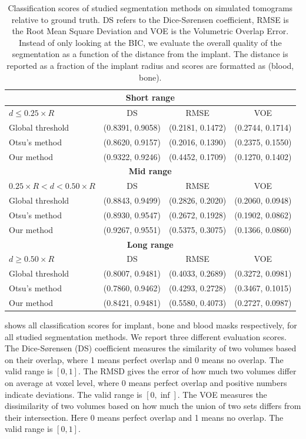 \begin{table}[]
\caption{
	Classification scores of studied segmentation methods on simulated
	tomograms relative to ground truth. DS refers to the Dice-Sørensen
	coefficient, RMSE is the Root Mean Square Deviation and VOE is the
	Volumetric Overlap Error. Instead of only looking at the BIC, we
	evaluate the overall quality of the segmentation as a function of the
	distance from the implant. The distance is reported as a fraction of the
	implant radius and scores are formatted as (blood, bone).
        }
\label{tab:scores}
\centering
\begin{tabular}{lccc}
\bottomrule
\multicolumn{4}{c}{\textbf{Short range}} \\
\toprule
$d \leq 0.25 \times R$ & DS & RMSE & VOE \\
\midrule
Global threshold & (0.8391, 0.9058) & (0.2181, 0.1472) & (0.2744, 0.1714) \\
Otsu's method    & (0.8620, 0.9157) & (0.2016, 0.1390) & (0.2375, 0.1550) \\
Our method       & (0.9322, 0.9246) & (0.4452, 0.1709) & (0.1270, 0.1402) \\
\bottomrule
\multicolumn{4}{c}{\textbf{Mid range}} \\
\toprule
$ 0.25 \times R < d < 0.50 \times R$ & DS & RMSE & VOE \\
\midrule
Global threshold & (0.8843, 0.9499) & (0.2826, 0.2020) & (0.2060, 0.0948) \\
Otsu's method    & (0.8930, 0.9547) & (0.2672, 0.1928) & (0.1902, 0.0862) \\
Our method       & (0.9267, 0.9551) & (0.5375, 0.3075) & (0.1366, 0.0860) \\
\bottomrule
\multicolumn{4}{c}{\textbf{Long range}} \\
\toprule
$d \geq 0.50 \times R$   & DS & RMSE & VOE \\
\midrule
Global threshold & (0.8007, 0.9481) & (0.4033, 0.2689) & (0.3272, 0.0981) \\
Otsu's method    & (0.7860, 0.9462) & (0.4293, 0.2728) & (0.3467, 0.1015) \\
Our method       & (0.8421, 0.9481) & (0.5580, 0.4073) & (0.2727, 0.0987) \\
\bottomrule
\end{tabular}
\end{table}

 shows all classification scores for implant, bone and blood masks
respectively, for all studied segmentation methods. We report three different
evaluation scores. The Dice-Sørensen (DS) coefficient measures the similarity
of two volumes based on their overlap, where 1 means perfect overlap and 0
means no overlap. The valid range is $[0,1]$. The RMSD gives the error of how
much two volumes differ on average at voxel level, where 0 means perfect
overlap and positive numbers indicate deviations. The valid range is
$[0,\inf]$. The VOE measures the dissimilarity of two volumes based on how much
the union of two sets differs from their intersection. Here 0 means perfect
overlap and 1 means no overlap. The valid range is $[0,1]$.


